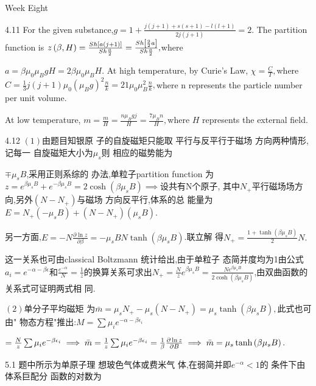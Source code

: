 \documentclass{ctexart}
\begin{document}
Week Eight 

4.11 For the given substance,$g=1+\frac{j\left( j+1\right) +s\left(
s+1\right) -l\left( l+1\right) }{2j(j+1)}=2.$ The partition function is $%
z\left( \beta ,H\right) =\frac{Sh\left[ a\left( j+1\right) \right] }{Sh\frac{%
a}{2}}=\frac{Sh\left[ \frac{9}{2}a\right] }{Sh\frac{a}{2}},$where

$a=\beta \mu _{0}\mu _{B}gH=2\beta \mu _{0}\mu _{B}H.$ At high temperature,
by Curie's Law, $\chi =\frac{C}{T},$where $C=\frac{1}{3}j\left( j+1\right)
\mu _{0}\left( \mu _{B}g\right) ^{2}\frac{n}{k}=21\mu _{0}\mu _{B}^{2}\frac{n%
}{k},$where n represents the particle number per unit volume.

\bigskip At low temperature, $m=\frac{m}{H}=\frac{n\mu _{B}gj}{H}=\frac{7\mu
_{B}n}{H},$where $H$ represents the external field.

4.12 $\left( 1\right) $由题目知银原%
子的自旋磁矩只能取%
平行与反平行于磁场%
方向两种情形,记每一%
自旋磁矩大小为$\mu _{s}$则%
相应的磁势能为

$\mp \mu _{s}B$,采用正则系综的%
办法,单粒子partition function 为$%
z=e^{\beta \mu _{s}B}+e^{-\beta \mu _{s}B}=2\cosh \left( \beta \mu
_{s}B\right) \implies $设共有N个原子,%
其中$N_{+}$平行磁场场方%
向,另外$\left( N-N_{+}\right) $与磁场%
方向反平行,体系的总%
能量为$E=N_{+}\left( -\mu _{s}B\right) +\left(
N-N_{+}\right) \left( \mu _{s}B\right) .$

另一方面,$E=-N\frac{\partial \ln z}{\partial \beta }%
=-\mu _{s}BN\tanh \left( \beta \mu _{s}B\right) $.联立解%
得$N_{+}=\frac{1+\tanh \left( \beta \mu _{s}B\right) }{2}N.$

这一关系也可由classical Boltzmann 
统计给出,由于单粒子%
态简并度均为1由公式$%
a_{i}=e^{-\alpha -\beta \epsilon }$和$\frac{e^{-\alpha }}{N}=\frac{1}{z%
}$的换算关系可求出$N_{+}=%
\frac{N}{z}e^{\beta \mu _{s}B}=\frac{Ne^{\beta \mu _{s}B}}{2\cosh \left(
\beta \mu _{s}B\right) }$,由双曲函数的%
关系式可证明两式相%
同.

$\left( 2\right) $单分子平均磁矩%
为$\bar{m}=\mu _{s}N_{+}-\mu _{s}\left( N-N_{+}\right) =\mu _{s}\tanh
\left( \beta \mu _{s}B\right) ,$此式也可由"%
物态方程"推出:$M=\sum \mu _{i}e^{-\alpha
-\beta \epsilon _{i}}$

$=\frac{N}{z}\sum \mu _{i}e^{-\beta \epsilon _{i}}\implies \bar{m}=\frac{1}{z%
}\sum \mu _{i}e^{-\beta \epsilon _{i}}=\frac{1}{\beta }\frac{\partial \ln z}{%
\partial B}\implies \bar{m}=\mu _{s}\tanh \left( \beta \mu _{s}B\right) .$

5.1 题中所示为单原子理%
想玻色气体或费米气%
体,在弱简并即$e^{-\alpha }<1$的%
条件下由体系巨配分%
函数的对数为
\end{document}
